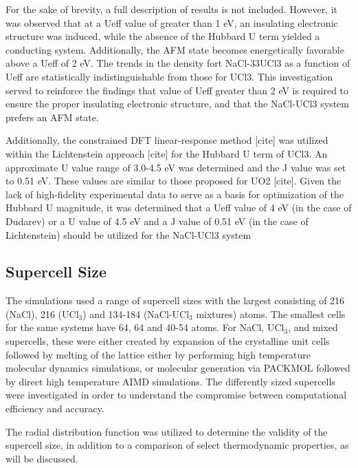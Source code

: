 \documentclass[preprint,3p,10pt,twocolumn,number,sort&compress]{elsarticle}
\begin{document}
For the sake of brevity, a full description of results is not included. However, it was observed that at a Ueff value of greater than 1 eV, an insulating electronic structure was induced, while the absence of the Hubbard U term yielded a conducting system. Additionally, the AFM state becomes energetically favorable above a Ueff of 2 eV. The trends in the density fort NaCl-33UCl3 as a function of Ueff are statistically indistinguishable from those for UCl3. This investigation served to reinforce the findings that value of Ueff greater than 2 eV is required to ensure the proper insulating electronic structure, and that the NaCl-UCl3 system prefers an AFM state. 

Additionally, the constrained DFT linear-response method [cite] was utilized within the Lichtenstein approach [cite] for the Hubbard U term of UCl3. An approximate U value range of 3.0-4.5 eV was determined and the J value was set to 0.51 eV. These values are similar to those proposed for UO2 [cite]. Given the lack of high-fidelity experimental data to serve as a basis for optimization of the Hubbard U magnitude, it was determined that a Ueff value of 4 eV (in the case of Dudarev) or a U value of 4.5 eV and a J value of 0.51 eV (in the case of Lichtenstein) should be utilized for the NaCl-UCl3 system


\subsection{Supercell Size}

The simulations used a range of supercell sizes with the largest consisting of 216 (NaCl), 216 (UCl$_3$) and 134-184 (NaCl-UCl$_3$ mixtures) atoms. The smallest cells for the same systems have 64, 64 and 40-54 atoms. For NaCl, UCl$_3$, and mixed supercells, these were either created by expansion of the crystalline unit cells followed by melting of the lattice either by performing high temperature molecular dynamics simulations, or molecular generation via PACKMOL \cite{packmol} followed by direct high temperature AIMD simulations. The differently sized supercells were investigated in order to understand the compromise between computational efficiency and accuracy. 

The radial distribution function was utilized to determine the validity of the supercell size, in addition to a comparison of select thermodynamic properties, as will be discussed. 
\end{document}
